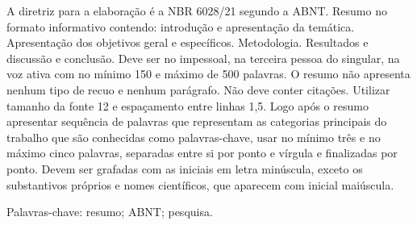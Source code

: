 \setlength{\absparsep}{18pt}
\begin{resumo}
    A diretriz para a elaboração é a NBR 6028/21 segundo a ABNT. Resumo no formato informativo contendo: introdução e apresentação da temática. Apresentação dos objetivos geral e específicos. Metodologia. Resultados e discussão e conclusão. Deve ser no impessoal, na terceira pessoa do singular, na voz ativa com no mínimo 150 e máximo de 500 palavras. O resumo não apresenta nenhum tipo de recuo e nenhum parágrafo. Não deve conter citações. Utilizar tamanho da fonte 12 e espaçamento entre linhas 1,5. Logo após o resumo apresentar sequência de palavras que representam as categorias principais do trabalho que são conhecidas como palavras-chave, usar no mínimo três e no máximo cinco palavras, separadas entre si por ponto e vírgula e finalizadas por ponto. Devem ser grafadas com as iniciais em letra minúscula, exceto os substantivos próprios e nomes científicos, que aparecem com inicial maiúscula.
    
    Palavras-chave: resumo; ABNT; pesquisa.
\end{resumo}
